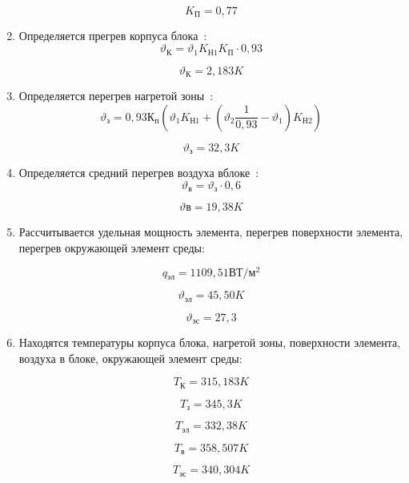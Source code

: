 \begin{enumerate}[label={\arabic*.}]
  $$K\mathrm{_П} = 0,77$$

\item Определяется прегрев корпуса блока~\cite{Rotkop1976}:
  \begin{equation}
    \vartheta\mathrm{_К} = \vartheta_1K\mathrm{_{Н1}}K\mathrm{_П} \cdot 0,93
  \end{equation}

  $$\vartheta\mathrm{_К} =2,183K$$

\item Определяется перегрев нагретой зоны~\cite{Rotkop1976}:
  \begin{equation}
\vartheta\mathrm{_з} = 0,93К\mathrm{_п}(\vartheta_1K\mathrm{_{Н1}} + (\vartheta_2\frac{1}{0,93} - \vartheta_1)K\mathrm{_{Н2}})
\end{equation}

$$\vartheta\mathrm{_з} = 32,3 K$$

\item Определяется средний перегрев воздуха вблоке~\cite{Rotkop1976}:
\begin{equation}
\vartheta\mathrm{_в} = \vartheta\mathrm{_з} \cdot 0,6
\end{equation}

$$\vartheta\mathrm{в} = 19,38 K$$


\item Рассчитывается удельная мощность элемента,
  перегрев поверхности элемента,
  перегрев окружающей элемент среды:

$$q\mathrm{_{эл}}= 1109,51\mathrm{ВТ/м^2}$$

$$\vartheta\mathrm{_{эл}} = 45,50K$$

$$\vartheta\mathrm{_{эс}} = 27,3$$

\item Находятся температуры
  корпуса блока,
  нагретой зоны,
  поверхности элемента,
  воздуха в блоке,
  окружающей элемент среды:

  
$$T\mathrm{_К} = 315,183K$$

$$T\mathrm{_з} = 345,3K$$

$$T\mathrm{_{эл}} = 332,38K$$

$$T\mathrm{_{в}} = 358,507K$$

$$T\mathrm{_{эс}} = 340,304K$$


\end{enumerate}